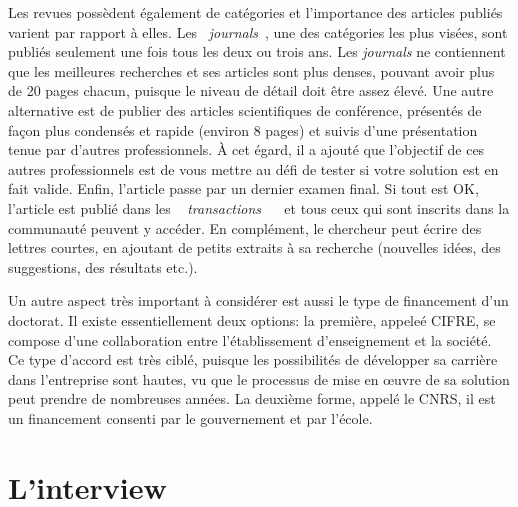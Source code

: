 \documentclass{article}
\begin{document}
Les revues possèdent également de catégories et l'importance des articles
publiés varient par rapport à elles. Les \og~\textit{journals}~\fg, une des
catégories les plus visées, sont publiés seulement une fois tous les deux ou
trois ans. Les \textit{journals} ne contiennent que les meilleures recherches
et ses articles sont plus denses, pouvant avoir plus de 20 pages chacun, puisque
le niveau de détail doit être assez élevé. Une autre alternative est de publier
des articles scientifiques de conférence, présentés de façon plus condensés et
rapide (environ 8 pages) et suivis d'une présentation tenue par d'autres
professionnels. À cet égard, il a ajouté que l'objectif de ces autres
professionnels est de vous mettre au défi de tester si votre solution est en
fait valide. Enfin, l'article passe par un dernier examen final. Si tout est OK,
l'article est publié dans les \og~ \textit{transactions} ~\fg~ et tous ceux qui
sont inscrits dans la communauté peuvent y accéder. En complément, le chercheur
peut écrire des lettres courtes, en ajoutant de petits extraits à sa recherche
(nouvelles idées, des suggestions, des résultats etc.).

\vspace{12pt}

Un autre aspect très important à considérer est aussi le type de financement
d'un doctorat. Il existe essentiellement deux options: la première, appeleé
CIFRE, se compose d'une collaboration entre l'établissement d'enseignement et la
société. Ce type d'accord est très ciblé, puisque les possibilités de développer
sa carrière dans l'entreprise sont hautes, vu que le processus de mise en œuvre
de sa solution peut prendre de nombreuses années. La deuxième forme, appelé le
CNRS, il est un financement consenti par le gouvernement et par l'école.

\section{L'interview}
\end{document}
